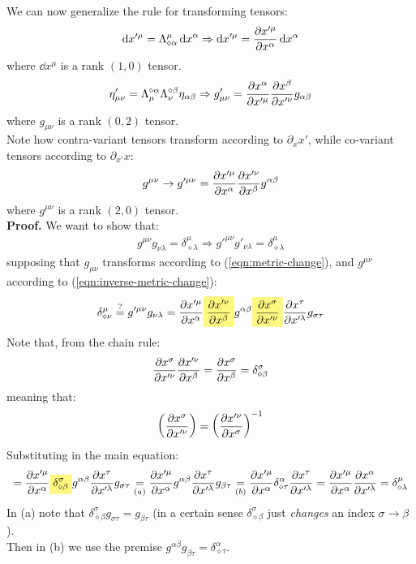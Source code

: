 \documentclass[../template.tex]{subfiles}
\begin{document}
We can now generalize the rule for transforming tensors:
\begin{align*}
    \dd{x'^\mu} = \Lambda^\mu_{\diamond \alpha}\dd{x}^\alpha \Rightarrow \dd{x'^\mu} = \pdv{x'^\mu}{x^\alpha} \dd{x^\alpha}
\end{align*}
where $\dd{x^\mu}$ is a rank $(1,0)$ tensor.
\begin{align}
    \eta_{\mu \nu}' = \Lambda_\mu^{\diamond \alpha} \Lambda_\nu^{\diamond \beta} \eta_{\alpha \beta} \Rightarrow g'_{\mu \nu} = \pdv{x^\alpha}{x'^\mu} \pdv{x^\beta}{x'^\nu} g_{\alpha \beta}
    \label{eqn:metric-change}
\end{align}  
where $g_{\mu \nu}$ is a rank $(0,2)$ tensor.\\
Note how contra-variant tensors transform according to $\partial_x x'$, while co-variant tensors according to $\partial_{x'} x$:
\begin{align}
    g^{\mu \nu} \to g'^{\mu \nu} = \pdv{x'^\mu}{x^\alpha} \pdv{x'^\nu}{x^\beta} g^{\alpha \beta}
    \label{eqn:inverse-metric-change}
\end{align}  
where $g^{\mu \nu}$ is a rank $(2,0)$ tensor.\\

\textbf{Proof.} We want to show that:
\begin{align*}
    g^{\mu \nu} g_{\nu \lambda} = \delta^\mu_{\diamond \lambda} \Rightarrow g'^{\mu \nu} g'_{\nu \lambda} = \delta^\mu_{\diamond \lambda}
\end{align*}
supposing that $g_{\mu \nu}$ transforms according to (\ref{eqn:metric-change}), and $g^{\mu \nu}$ according to (\ref{eqn:inverse-metric-change}):
\begin{align*}
    \delta^\mu_{\diamond \nu} \overset{?}{=}  g'^{\mu \nu}g_{\nu \lambda} = \pdv{x'^\mu}{x^\alpha} \hlc{Yellow}{\pdv{x'^\nu}{x^\beta}} g^{\alpha \beta} \hlc{Yellow}{\pdv{x^\sigma}{x'^\nu} }\pdv{x^\tau}{x'^\lambda} g_{\sigma \tau}
\end{align*}  
Note that, from the chain rule:
\begin{align*}
    \pdv{x^\sigma}{x'^\nu} \pdv{x'^\nu}{x^\beta} = \pdv{x^\sigma}{x^\beta} = \delta^\sigma_{\diamond \beta}
\end{align*}
meaning that:
\begin{align*}
    \left(\pdv{x^\sigma}{x'^\nu}\right) = \left(\pdv{x'^\nu}{x^\sigma}\right)^{-1}
\end{align*}
Substituting in the main equation:
\begin{align*}
    = \pdv{x'^\mu}{x^\alpha} \hlc{Yellow}{\delta^\sigma_{\diamond \beta}}g^{\alpha \beta}\pdv{x^\tau}{x'^\lambda} g_{\sigma \tau} \underset{(a)}{=}  \pdv{x'^\mu}{x^\alpha}g^{\alpha \beta} \pdv{x^\tau}{x'^\lambda} g_{\beta \tau} \underset{(b)}{=}  \pdv{x'^\mu}{x^\alpha} \delta^\alpha_{\diamond \tau} \pdv{x^\tau}{x'^\lambda} = \pdv{x'^\mu}{x^\alpha}\pdv{x^\alpha}{x'^\lambda} = \delta^{\mu}_{\diamond \lambda}
\end{align*}
In (a) note that $\delta^\sigma_{\diamond \beta} g_{\sigma \tau} = g_{\beta \tau}$ (in a certain sense $\delta^{\sigma}_{\diamond \beta}$ just \textit{changes} an index $\sigma \to \beta$).\\
Then in (b) we use the premise $g^{\alpha \beta}g_{\beta \tau} =\delta^\alpha_{\diamond \tau}$.
\end{document}
